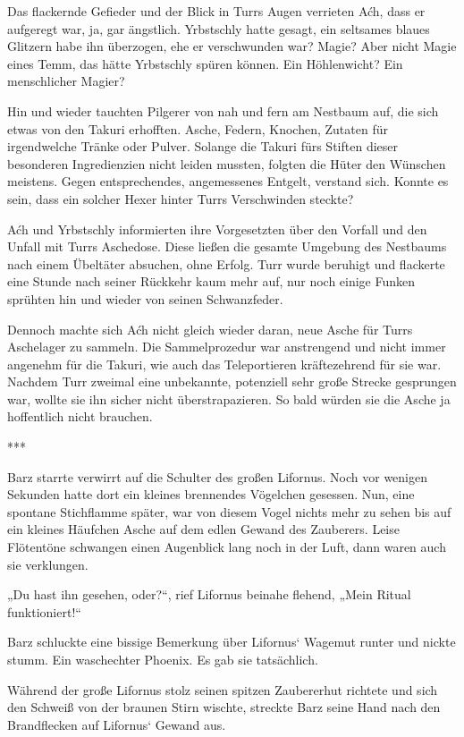 Das flackernde Gefieder und der Blick in Turrs Augen verrieten Aćh, dass er aufgeregt war, ja, gar ängstlich. Yrbstschly hatte gesagt, ein seltsames blaues Glitzern habe ihn überzogen, ehe er verschwunden war? Magie? Aber nicht Magie eines Temm, das hätte Yrbstschly spüren können. Ein Höhlenwicht? Ein menschlicher Magier?

Hin und wieder tauchten Pilgerer von nah und fern am Nestbaum auf, die sich etwas von den Takuri erhofften. Asche, Federn, Knochen, Zutaten für irgendwelche Tränke oder Pulver. Solange die Takuri fürs Stiften dieser besonderen Ingredienzien nicht leiden mussten, folgten die Hüter den Wünschen meistens. Gegen entsprechendes, angemessenes Entgelt, verstand sich. Konnte es sein, dass ein solcher Hexer hinter Turrs Verschwinden steckte?

Aćh und Yrbstschly informierten ihre Vorgesetzten über den Vorfall und den Unfall mit Turrs Aschedose. Diese ließen die gesamte Umgebung des Nestbaums nach einem Übeltäter absuchen, ohne Erfolg. Turr wurde beruhigt und flackerte eine Stunde nach seiner Rückkehr kaum mehr auf, nur noch einige Funken sprühten hin und wieder von seinen Schwanzfeder.

Dennoch machte sich Aćh nicht gleich wieder daran, neue Asche für Turrs Aschelager zu sammeln. Die Sammelprozedur war anstrengend und nicht immer angenehm für die Takuri, wie auch das Teleportieren kräftezehrend für sie war. Nachdem Turr zweimal eine unbekannte, potenziell sehr große Strecke gesprungen war, wollte sie ihn sicher nicht überstrapazieren. So bald würden sie die Asche ja hoffentlich nicht brauchen.\bigskip

***\bigskip

Barz starrte verwirrt auf die Schulter des großen Lifornus. Noch vor wenigen Sekunden hatte dort ein kleines brennendes Vögelchen gesessen. Nun, eine spontane Stichflamme später, war von diesem Vogel nichts mehr zu sehen bis auf ein kleines Häufchen Asche auf dem edlen Gewand des Zauberers. Leise Flötentöne schwangen einen Augenblick lang noch in der Luft, dann waren auch sie verklungen.

„Du hast ihn gesehen, oder?“, rief Lifornus beinahe flehend, „Mein Ritual funktioniert!“

Barz schluckte eine bissige Bemerkung über Lifornus‘ Wagemut runter und nickte stumm. Ein waschechter Phoenix. Es gab sie tatsächlich.

Während der große Lifornus stolz seinen spitzen Zaubererhut richtete und sich den Schweiß von der braunen Stirn wischte, streckte Barz seine Hand nach den Brandflecken auf Lifornus‘ Gewand aus.


